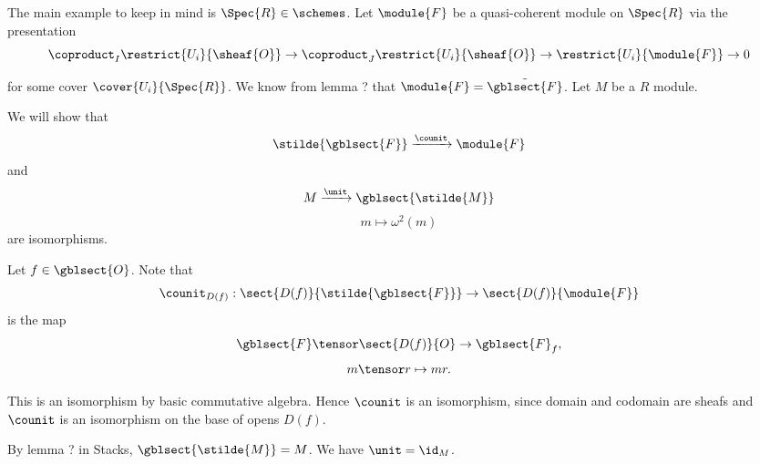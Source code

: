 \begin{example}
The main example to keep in mind is $\Spec{R} \in \schemes$.
Let $\module{F}$ be a quasi-coherent module on $\Spec{R}$
via the presentation
\[\coproduct_{I} \restrict{U_i}{\sheaf{O}} \rightarrow \coproduct_J \restrict{U_i}{\sheaf{O}} 
	\rightarrow \restrict{U_i}{\module{F}} \rightarrow 0\]

for some cover $\cover{U_i}{\Spec{R}}$.
We know from lemma ? that $\module{F} = \tilde{\gblsect{F}}$.
Let $M$ be a $R$ module.

We will show that
\[\stilde{\gblsect{F}} \xrightarrow{\counit} \module{F}\]
and
\[M \xrightarrow{\unit} \gblsect{\stilde{M}}\]
\[m \mapsto \omega^2(m)\]
are isomorphisms.

Let $f \in \gblsect{O}$.
Note that 
\[\counit_{D(f)}: \sect{D(f)}{\stilde{\gblsect{F}}} \rightarrow \sect{D(f)}{\module{F}}\]
is the map
\[\gblsect{F}\tensor \sect{D(f)}{O} \rightarrow \gblsect{F}_f,\]
\[m \tensor r \mapsto mr.\]

This is an isomorphism by basic commutative algebra. Hence $\counit$ is an isomorphism, since domain and codomain are sheafs and $\counit$ is an isomorphism on the base of opens $D(f)$.

By lemma ? in Stacks, $\gblsect{\stilde{M}} = M$.
We have $\unit = \id_M$.
\end{example}
